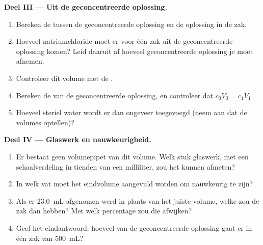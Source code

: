 \begin{problem}
\medskip
\noindent\textbf{Deel III --- Uit de geconcentreerde oplossing.}
\begin{enumerate}[resume]
  \item Bereken de  tussen de geconcentreerde oplossing en
        de oplossing in de zak.
  \item Hoeveel natriumchloride moet er voor één zak uit de geconcentreerde
        oplossing komen? Leid daaruit af hoeveel geconcentreerde oplossing
        je moet afnemen.
  \item Controleer dit volume met de .
  \item Bereken de  van de geconcentreerde oplossing,
        en controleer dat $c_0 V_0 = c_1 V_1$.
  \item Hoeveel steriel water wordt er dan ongeveer toegevoegd (neem aan
        dat de volumes optellen)?
\end{enumerate}

\medskip
\noindent\textbf{Deel IV --- Glaswerk en nauwkeurigheid.}
\begin{enumerate}[resume]
  \item Er bestaat geen volumepipet van dit volume. Welk stuk glaswerk,
        met een schaalverdeling in tienden van een milliliter, zou het
        kunnen afmeten?
  \item In welk vat moet het eindvolume aangevuld worden om nauwkeurig te
        zijn?
  \item Als er \qty{23.0}{mL} afgenomen werd in plaats van het juiste
        volume, welke  zou de zak dan hebben? Met welk
        percentage zou die afwijken?
  \item Geef het eindantwoord: hoeveel van de geconcentreerde oplossing
        gaat er in één zak van \qty{500}{mL}?
\end{enumerate}
\end{problem}
